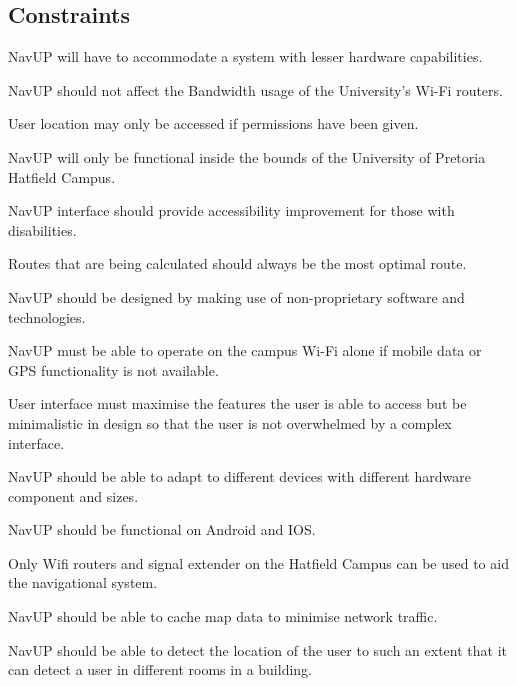 \documentclass[12pt,a4paper]{article}
\begin{document}
	\subsection{Constraints}
		\begin{ConstraintEnum}
			\item NavUP will have to accommodate a system with lesser hardware capabilities.
			\item NavUP should not affect the Bandwidth usage of the University's Wi-Fi routers.
			\item User location may only be accessed if permissions have been given.
			\item NavUP will only be functional inside the bounds of the University of Pretoria Hatfield Campus.
			\item NavUP interface should provide accessibility improvement for those with disabilities.
			\item Routes that are being calculated should always be the most optimal route.
			\item NavUP should be designed by making use of non-proprietary software and technologies.
			\item NavUP must be able to operate on the campus Wi-Fi alone if mobile data or GPS functionality is not available.
			\item User interface must maximise the features the user is able to access but be minimalistic in design so that the user is not overwhelmed by a complex interface.
			\item NavUP should be able to adapt to different devices with different hardware component and sizes.
			\item NavUP should be functional on Android and IOS.
			\item Only Wifi routers and signal extender on the Hatfield Campus can be used to aid the navigational system.
			\item NavUP should be able to cache map data to minimise network traffic.
			\item NavUP should be able to detect the location of the user to such an extent that it can detect a user in different rooms in a building.
		\end{ConstraintEnum}
\end{document}

